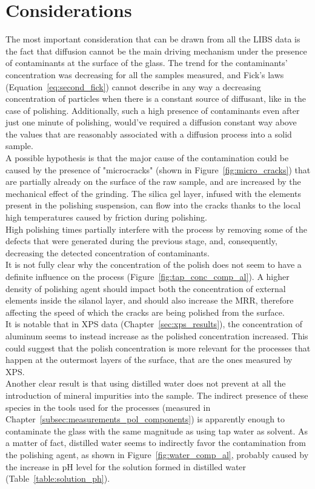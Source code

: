 \section{Considerations}
\label{sec:considerations}
The most important consideration that can be drawn from all the LIBS data is the fact that diffusion cannot be the main driving mechanism under the presence of contaminants at the surface of the glass. The trend for the contaminants' concentration was decreasing for all the samples measured, and Fick's laws (Equation~\ref{eq:second_fick}) cannot describe in any way a decreasing concentration of particles when there is a constant source of diffusant, like in the case of polishing. Additionally, such a high presence of contaminants even after just one minute of polishing, would've required a diffusion constant way above the values that are reasonably associated with a diffusion process into a solid sample.
\\
A possible hypothesis is that the major cause of the contamination could be caused by the presence of "microcracks" (shown in Figure~\ref{fig:micro_cracks}) that are partially already on the surface of the raw sample, and are increased by the mechanical effect of the grinding. The silica gel layer, infused with the elements present in the polishing suspension, can flow into the cracks thanks to the local high temperatures caused by friction during polishing.
\\
High polishing times partially interfere with the process by removing some of the defects that were generated during the previous stage, and, consequently, decreasing the detected concentration of contaminants.
\\
It is not fully clear why the concentration of the polish does not seem to have a definite influence on the process (Figure~\ref{fig:tap_conc_comp_al}). A higher density of polishing agent should impact both the concentration of external elements inside the silanol layer, and should also increase the MRR, therefore affecting the speed of which the cracks are being polished from the surface.
\\
It is notable that in XPS data (Chapter~\ref{sec:xps_results}), the concentration of aluminum seems to instead increase as the polished concentration increased. This could suggest that the polish concentration is more relevant for the processes that happen at the outermost layers of the surface, that are the ones measured by XPS.
\\
Another clear result is that using distilled water does not prevent at all the introduction of mineral impurities into the sample. The indirect presence of these species in the tools used for the processes (measured in Chapter~\ref{subsec:measurements_pol_components}) is apparently enough to contaminate the glass with the same magnitude as using tap water as solvent. As a matter of fact, distilled water seems to indirectly favor the contamination from the polishing agent, as shown in Figure~\ref{fig:water_comp_al}, probably caused by the increase in pH level for the solution formed in distilled water (Table~\ref{table:solution_ph}).

